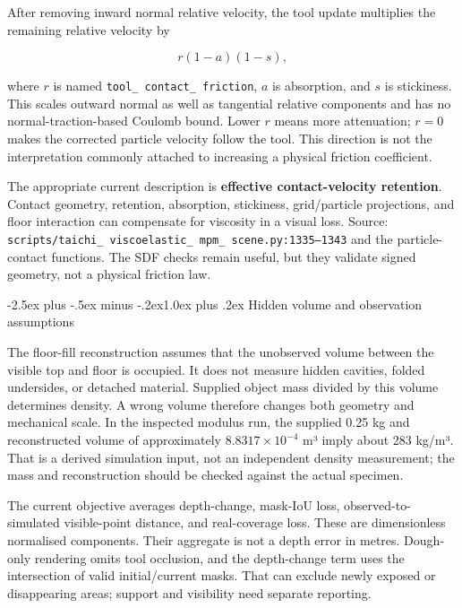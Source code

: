 \documentclass[
  11pt,
]{article}
\makeatletter
\renewcommand\subsection{\needspace{5\baselineskip}\@startsection{subsection}{2}{\z@}%
  {-2.5ex plus -.5ex minus -.2ex}{1.0ex plus .2ex}%
  {\normalfont\sffamily\large\bfseries\color{accent}}}
\makeatother
\begin{document}
After removing inward normal relative velocity, the tool update
multiplies the remaining relative velocity by

\[
r(1-a)(1-s),
\]

where \(r\) is named
\texttt{tool\_ contact\_ friction}, \(a\) is
absorption, and \(s\) is stickiness. This scales outward normal as well
as tangential relative components and has no normal-traction-based
Coulomb bound. Lower \(r\) means more attenuation; \(r=0\) makes the
corrected particle velocity follow the tool. This direction is not the
interpretation commonly attached to increasing a physical friction
coefficient.

The appropriate current description is \textbf{effective
contact-velocity retention}. Contact geometry, retention, absorption,
stickiness, grid/particle projections, and floor interaction can
compensate for viscosity in a visual loss. Source:
\texttt{scripts/\allowbreak{}taichi\_ viscoelastic\_ mpm\_ scene.py:1335–1343}
and the particle-contact functions. The SDF checks remain useful, but
they validate signed geometry, not a physical friction law.

\subsection{Hidden volume and observation
assumptions}\label{hidden-volume-and-observation-assumptions}

The floor-fill reconstruction assumes that the unobserved volume between
the visible top and floor is occupied. It does not measure hidden
cavities, folded undersides, or detached material. Supplied object mass
divided by this volume determines density. A wrong volume therefore
changes both geometry and mechanical scale. In the inspected modulus
run, the supplied 0.25 kg and reconstructed volume of approximately
\(8.8317\times10^{-4}\) m³ imply about 283 kg/m³. That is a derived
simulation input, not an independent density measurement; the mass and
reconstruction should be checked against the actual specimen.

The current objective averages depth-change, mask-IoU loss,
observed-to-simulated visible-point distance, and real-coverage loss.
These are dimensionless normalised components. Their aggregate is not a
depth error in metres. Dough-only rendering omits tool occlusion, and
the depth-change term uses the intersection of valid initial/current
masks. That can exclude newly exposed or disappearing areas; support and
visibility need separate reporting.
\end{document}
